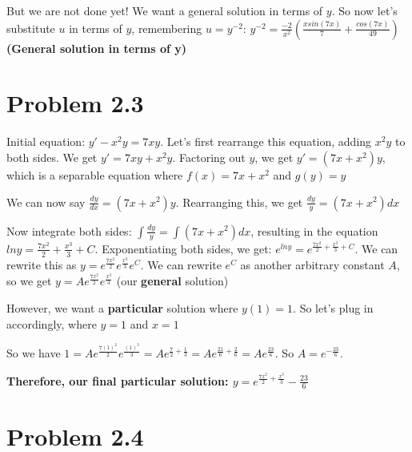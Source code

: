 \documentclass{article}
\begin{document}
\noindent But we are not done yet!  We want a general solution in terms of $y$.  So now let's substitute $u$ in terms of $y$, remembering $u = y^{-2}$: $y^{-2} = \frac{-2}{x^{2}}(\frac{xsin(7x)}{7} + \frac{cos(7x)}{49})$ \textbf{(General solution in terms of y)}

\section{Problem 2.3}

Initial equation: $y' - x^{2}y = 7xy$.  Let's first rearrange this equation, adding $x^{2}y$ to both sides.  We get $y' = 7xy + x^{2}y$.  Factoring out $y$, we get $y' = (7x + x^{2})y$, which is a separable equation where $f(x) = 7x + x^{2}$ and $g(y) = y$ \par\vspace{0.25cm}

\noindent We can now say $\frac{dy}{dx} = (7x + x^{2})y$.  Rearranging this, we get $\frac{dy}{y} = (7x + x^{2})dx$ \par\vspace{0.25cm}

\noindent Now integrate both sides: $\int \frac{dy}{y} = \int (7x + x^{2}) dx$, resulting in the equation $lny = \frac{7x^{2}}{2} + \frac{x^{3}}{3} + C$.  Exponentiating both sides, we get: $e^{lny} = e^{\frac{7x^{2}}{2} + \frac{x^{3}}{3} + C}$.  We can rewrite this as $y = e^{\frac{7x^{2}}{2}}e^{\frac{x^{3}}{3}}e^{C}$.  We can rewrite $e^{C}$ as another arbitrary constant $A$, so we get $y = Ae^{\frac{7x^{2}}{2}}e^{\frac{x^{3}}{3}}$ (our \textbf{general} solution) \par\vspace{0.25cm}

\noindent However, we want a \textbf{particular} solution where $y(1) = 1$.  So let's plug in accordingly, where $y = 1$ and $x = 1$ \par\vspace{0.25cm}

\noindent So we have $1 = Ae^{\frac{7(1)^{2}}{2}}e^{\frac{(1)^{3}}{3}} = Ae^{\frac{7}{2} + \frac{1}{3}} = Ae^{\frac{21}{6} + \frac{2}{6}} = Ae^{\frac{23}{6}}$.  So $A = e^{-\frac{23}{6}}$. \par\vspace{0.25cm}

\noindent \textbf{Therefore, our final particular solution: $y = e^{\frac{7x^{2}}{2} + \frac{x^{3}}{3}} - \frac{23}{6}$}

\section{Problem 2.4}
\end{document}
